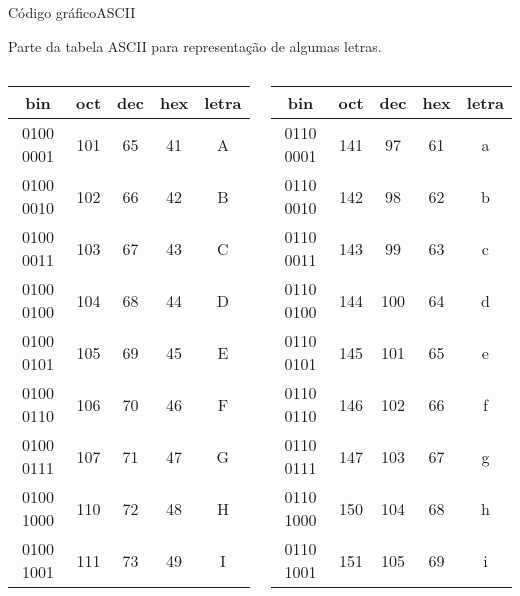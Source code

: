 \begin{frame}{Código gráfico}{ASCII}

  Parte da tabela ASCII para representação de algumas letras.
  \bigskip
  \footnotesize
\begin{columns}
\begin{column}{.5\textwidth}
  \begin{tabular}{|c|c|c|c|c|}\hline
    \bf bin &	\bf oct &\bf	dec &\bf	hex &\bf	letra\\\hline
  0100 0001 &	101 &	65 &	41 &	A\\\hline
  0100 0010 &	102 &	66 &	42 &	B\\\hline
  0100 0011 &	103 &	67 &	43 &	C\\\hline
  0100 0100 &	104 &	68 &	44 &	D\\\hline
  0100 0101 &	105 &	69 &	45 &	E\\\hline
  0100 0110 &	106 &	70 &	46 &	F\\\hline
  0100 0111 &	107 &	71 &	47 &	G\\\hline
  0100 1000 &	110 &	72 &	48 &	H\\\hline
  0100 1001 &	111 &	73 &	49 &	I\\\hline
\end{tabular}
\end{column}
\begin{column}{.5\textwidth}
  \begin{tabular}{|c|c|c|c|c|}\hline
 \bf bin &	\bf oct &\bf	dec &\bf	hex &\bf	letra\\\hline
   0110 0001 &	141 &	97 &	61 &	a \\\hline
    0110 0010 &	142 &	98 &	62 &	b \\\hline
    0110 0011 &	143 &	99 &	63 &	c \\\hline
    0110 0100 &	144 &	100 &	64 &	d \\\hline
    0110 0101 &	145 &	101 &	65 &	e \\\hline
    0110 0110 &	146 &	102 &	66 &	f \\\hline
    0110 0111 &	147 &	103 &	67 &	g \\\hline
    0110 1000 &	150 &	104 &	68 &	h \\\hline
    0110 1001 &	151 &	105 &	69 &	i \\\hline
  \end{tabular}
\end{column}
\end{columns}
\end{frame}

